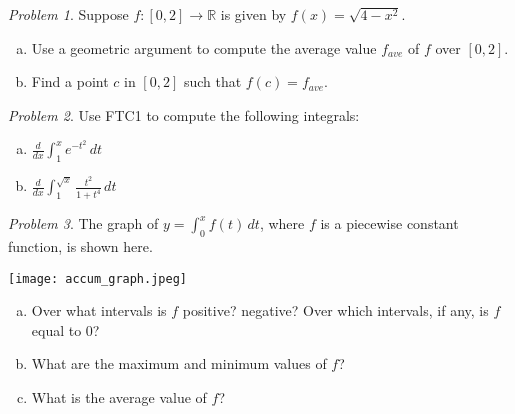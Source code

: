 \documentclass[11pt,twoside]{amsart}
\theoremstyle{plain}
\theoremstyle{remark}
\newtheorem{prob}{Problem}
\theoremstyle{definition}
\theoremstyle{definition}
\newcommand{\RR}{\mathbb{R}}
\begin{document}
\begin{prob}
Suppose $f\colon [0,2]\to \RR$ is given by $f(x) = \sqrt{4-x^2}$.
\begin{enumerate}[(a)]
\item Use a geometric argument to compute the average value $f_{ave}$ of $f$ over $[0,2]$.
\item Find a point $c$ in $[0,2]$ such that $f(c) = f_{ave}$. 
\end{enumerate}
\end{prob}

\begin{prob}
Use FTC1 to compute the following integrals:
\begin{enumerate}[(a)]
\item $\frac{d}{dx} \int_1^x e^{-t^2}\,dt$
\item $\frac{d}{dx} \int_1^{\sqrt{x}} \frac{t^2}{1+t^4}\,dt$
\end{enumerate}
\end{prob}

\begin{prob}
The graph of $y = \int_0^x f(t)\,dt$, where $f$ is a piecewise constant function, is shown here.

\begin{center}
\texttt{[image: accum\_graph.jpeg]}
\end{center}

\begin{enumerate}[(a)]
\item Over what intervals is $f$ positive? negative? Over which intervals, if any, is $f$ equal to $0$?
\item What are the maximum and minimum values of $f$?
\item What is the average value of $f$?
\end{enumerate}
\end{prob}
\end{document}
